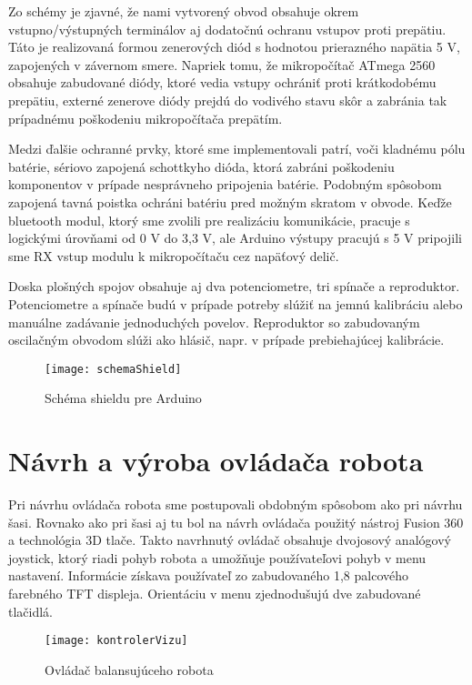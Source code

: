 Zo schémy je zjavné, že nami vytvorený obvod obsahuje okrem vstupno/výstupných terminálov aj dodatočnú ochranu vstupov proti prepätiu. Táto je realizovaná formou zenerových diód s hodnotou prierazného napätia 5 V, zapojených v závernom smere. Napriek tomu, že mikropočítač ATmega 2560 obsahuje zabudované diódy, ktoré vedia vstupy ochrániť proti krátkodobému prepätiu, externé zenerove diódy prejdú do vodivého stavu skôr a zabránia tak prípadnému poškodeniu mikropočítača prepätím. 

Medzi ďalšie ochranné prvky, ktoré sme implementovali patrí, voči kladnému pólu batérie, sériovo zapojená schottkyho dióda, ktorá zabráni poškodeniu komponentov v prípade nesprávneho pripojenia batérie. Podobným spôsobom zapojená tavná poistka ochráni batériu pred možným skratom v obvode.  Keďže bluetooth modul, ktorý sme zvolili pre realizáciu komunikácie, pracuje s logickými úrovňami od 0 V do 3,3 V, ale Arduino výstupy pracujú s 5 V pripojili sme RX vstup modulu k mikropočítaču cez napäťový delič. 

Doska plošných spojov obsahuje aj dva potenciometre, tri spínače a reproduktor. Potenciometre a spínače budú v prípade potreby slúžiť na jemnú kalibráciu alebo manuálne zadávanie jednoduchých povelov. Reproduktor so zabudovaným oscilačným obvodom slúži ako hlásič, napr. v prípade prebiehajúcej kalibrácie.

\begin{sidewaysfigure}[p]
\centering
\texttt{[image: schemaShield]}
\caption{Schéma shieldu pre Arduino}
\label{fig:schemaShield} 
\end{sidewaysfigure}

\section{Návrh a výroba ovládača robota}

Pri návrhu ovládača robota sme postupovali obdobným spôsobom ako pri návrhu šasi. Rovnako ako pri šasi aj tu bol na návrh ovládača použitý nástroj Fusion 360 a technológia 3D tlače. Takto navrhnutý ovládač obsahuje dvojosový analógový joystick, ktorý riadi pohyb robota a umožňuje používateľovi pohyb v menu nastavení. Informácie získava používateľ zo zabudovaného 1,8 palcového farebného TFT displeja. Orientáciu v menu zjednodušujú dve zabudované tlačidlá.

\begin{figure}
\centering
\texttt{[image: kontrolerVizu]}
\caption{Ovládač balansujúceho robota}
\label{fig:kontrolerVizu}
\end{figure}

